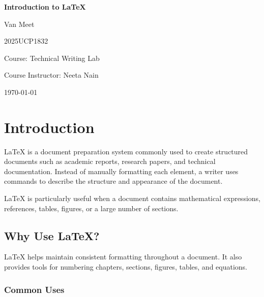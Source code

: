 \documentclass[12pt,a4paper]{report}
\begin{document}
\begin{titlepage}
\thispagestyle{empty}
\centering
\vspace*{2cm}
{\Huge\bfseries Introduction to LaTeX\par}
\vspace{2cm}
{\Large Van Meet \par}
\vspace{0.5cm}
2025UCP1832\par
\vspace{1.5cm}
Course: Technical Writing Lab\par
Course Instructor: Neeta Nain\par
\vfill
{\large \today\par}
\end{titlepage}

\pagestyle{fancy}

\begin{abstract}
This report introduces LaTeX as a document preparation system. It describes the basic structure of a LaTeX document, explains how chapters and sections organize content, and demonstrates how formatting and page headers can be customized. It also briefly discusses the use of LaTeX for mathematical and technical documents.
\end{abstract}

\chapter{Introduction}

LaTeX is a document preparation system commonly used to create structured documents such as academic reports, research papers, and technical documentation. Instead of manually formatting each element, a writer uses commands to describe the structure and appearance of the document.

LaTeX is particularly useful when a document contains mathematical expressions, references, tables, figures, or a large number of sections.

\section{Why Use LaTeX?}

LaTeX helps maintain consistent formatting throughout a document. It also provides tools for numbering chapters, sections, figures, tables, and equations.

\subsection{Common Uses}
\end{document}

